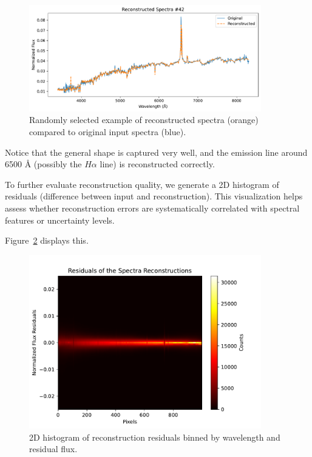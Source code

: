 \documentclass[11pt]{article}
\begin{document}
\begin{figure}[h!]
    \centering
    \includegraphics[width=0.9\textwidth]{spectrum_recon.pdf}
    \caption{Randomly selected example of reconstructed spectra (orange) compared to original input spectra (blue).}
    \label{fig:spectra}
\end{figure}

Notice that the general shape is captured very well, and the emission line around 6500 \AA{} (possibly the $H\alpha$ line) is reconstructed correctly.

To further evaluate reconstruction quality, we generate a 2D histogram of residuals (difference between input and reconstruction). This visualization helps assess whether reconstruction errors are systematically correlated with spectral features or uncertainty levels.

Figure~\ref{fig:residual_histogram} displays this.

\begin{figure}[h!]
    \centering
    \includegraphics[width=0.9\textwidth]{residuals.pdf}
    \caption{2D histogram of reconstruction residuals binned by wavelength and residual flux.}
    \label{fig:residual_histogram}
\end{figure}
\end{document}
